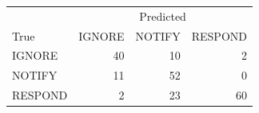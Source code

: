 \begin{tabular}{lrrr}
\toprule
 & \multicolumn{3}{c}{Predicted} \\
True & IGNORE & NOTIFY & RESPOND \\
\midrule
IGNORE & 40 & 10 & 2 \\
NOTIFY & 11 & 52 & 0 \\
RESPOND & 2 & 23 & 60 \\
\bottomrule
\end{tabular}
